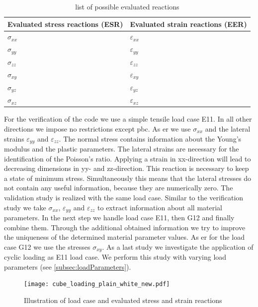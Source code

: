\begin{table}[H]
\centering
\caption{list of possible evaluated reactions}
\label{tab:evaluatedReactions}
\renewcommand{\arraystretch}{1.1}
\begin{tabular}{C{0.25\textwidth}C{0.25\textwidth}}
\toprule
\textbf{Evaluated stress reactions (ESR)} & \textbf{Evaluated strain reactions (EER)} \\ \midrule
$\sigma_{xx}$ & $\varepsilon_{xx}$ \\ \hline
$\sigma_{yy}$ & $\varepsilon_{yy}$  \\ \hline
$\sigma_{zz}$ & $\varepsilon_{zz}$ \\ \hline
$\sigma_{xy}$ & $\varepsilon_{xy}$ \\ \hline
$\sigma_{yz}$ & $\varepsilon_{yz}$ \\ \hline
$\sigma_{xz}$ & $\varepsilon_{xz}$ \\ \bottomrule
\end{tabular}

\end{table}

For the verification of the code we use a simple tensile load case E11.
In all other directions we impose no restrictions except \acrshort{pbc}. As \acrlong{er} we use $\sigma_{xx}$ and the lateral strains $\varepsilon_{yy}$ and $\varepsilon_{zz}$. The normal stress contains information about the Young's modulus and the plastic parameters. The lateral strains are necessary for the identification of the Poisson's ratio. Applying a strain in xx-direction will lead to decreasing dimensions in yy- and zz-direction. This reaction is necessary to keep a state of minimum stress. Simultaneously this means that the lateral stresses do not contain any useful information, because they are numerically zero. 
The validation study is realized with the same load case. Similar to the verification study we take $\sigma_{xx}$,  $\varepsilon_{yy}$ and $\varepsilon_{zz}$ to extract information about all material parameters. 
In the next step we handle load case E11, then G12 and finally combine them. Through the additional obtained information we try to improve the uniqueness of the determined material parameter values. As \acrlong{er} for the load case G12 we use the stresses $\sigma_{xy}$.
As a last study we investigate the application of cyclic loading as E11 load case. We perform this study with varying load parameters (see \autoref{subsec:loadParameters}). 


\begin{figure}[H]
    \centering
    \texttt{[image: cube\_loading\_plain\_white\_new.pdf]}
    \caption{Illustration of load case and evaluated stress and strain reactions}
    \label{fig:evaluationMeasurements}
\end{figure}

